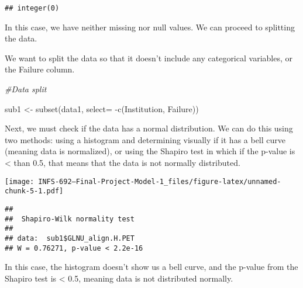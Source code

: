 \documentclass[
]{article}
\newenvironment{Shaded}{\begin{snugshade}}{\end{snugshade}}
\newcommand{\AttributeTok}[1]{\textcolor[rgb]{0.77,0.63,0.00}{#1}}
\newcommand{\CommentTok}[1]{\textcolor[rgb]{0.56,0.35,0.01}{\textit{#1}}}
\newcommand{\FunctionTok}[1]{\textcolor[rgb]{0.00,0.00,0.00}{#1}}
\newcommand{\NormalTok}[1]{#1}
\newcommand{\OtherTok}[1]{\textcolor[rgb]{0.56,0.35,0.01}{#1}}
\newcommand{\SpecialCharTok}[1]{\textcolor[rgb]{0.00,0.00,0.00}{#1}}
\begin{document}
\begin{verbatim}
## integer(0)
\end{verbatim}

In this case, we have neither missing nor null values. We can proceed to
splitting the data.

We want to split the data so that it doesn't include any categorical
variables, or the Failure column.

\begin{Shaded}
\begin{Highlighting}[]
\CommentTok{\#Data split}

\NormalTok{sub1 }\OtherTok{\textless{}{-}} \FunctionTok{subset}\NormalTok{(data1, }\AttributeTok{select=} \SpecialCharTok{{-}}\FunctionTok{c}\NormalTok{(Institution, Failure))}
\end{Highlighting}
\end{Shaded}

Next, we must check if the data has a normal distribution. We can do
this using two methods: using a histogram and determining visually if it
has a bell curve (meaning data is normalized), or using the Shapiro test
in which if the p-value is \textless{} than 0.5, that means that the
data is not normally distributed.

\begin{Shaded}
\end{Shaded}

\texttt{[image: INFS-692---Final-Project-Model-1\_files/figure-latex/unnamed-chunk-5-1.pdf]}

\begin{Shaded}
\end{Shaded}

\begin{verbatim}
## 
##  Shapiro-Wilk normality test
## 
## data:  sub1$GLNU_align.H.PET
## W = 0.76271, p-value < 2.2e-16
\end{verbatim}

In this case, the histogram doesn't show us a bell curve, and the
p-value from the Shapiro test is \textless{} 0.5, meaning data is not
distributed normally.
\end{document}
